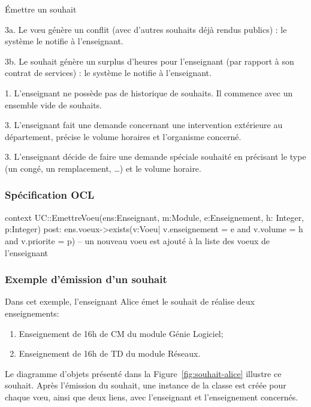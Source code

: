 \begin{ocl}
\begin{usecase}{\'Emettre un souhait}
\begin{extension}
 \item [3a.] Le v\oe u génère un conflit (avec d'autres souhaits déjà rendus publics) : le système le notifie à l'enseignant.
 \item [3b.] Le souhait génère un surplus d'heures pour l'enseignant (par rapport à son contrat de services) : le système le notifie à l'enseignant.
\end{extension}


\begin{variation}
	\item [1.] L'enseignant ne possède pas de historique de souhaits. Il commence avec un ensemble vide de souhaits.
	\item [3.] L'enseignant fait une demande concernant une intervention extérieure au département, précise le volume horaires et l'organisme concerné.
	\item [3.] L'enseignant décide de faire une demande spéciale souhaité en précisant le type (un congé, un remplacement, \dots) et le volume horaire.
\end{variation}
\end{usecase}

\subsubsection{Spécification OCL}
\begin{ocl}
context UC::EmettreVoeu(ens:Enseignant, m:Module, e:Enseignement, h: Integer, p:Integer)
post: 
ens.voeux->exists(v:Voeu| v.enseignement = e and v.volume = h and v.priorite = p)
-- un nouveau voeu est ajouté à la liste des voeux de l'enseignant
\end{ocl}


\subsubsection{Exemple d'émission d'un souhait}
Dans cet exemple, l'enseignant Alice émet le souhait de réalise deux enseignements:
\begin{enumerate}
	\item Enseignement de 16h de CM du module Génie Logiciel;
	\item Enseignement de 16h de TD du module Réseaux.
\end{enumerate}
Le diagramme d'objets présenté dans la Figure~\ref{fig:souhait-alice} illustre ce souhait.
Après l'émission du souhait, une instance de la classe  est créée pour chaque vœu, ainsi que deux liens, avec l'enseignant et l'enseignement concernés. 


\end{ocl}
